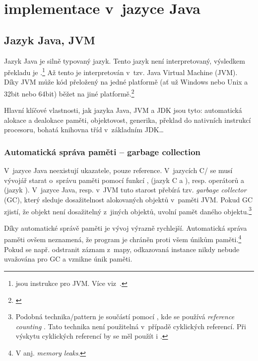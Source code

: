 \chapter{\MIndex{} implementace v~jazyce Java}


\section{Jazyk Java, JVM}

Jazyk Java je silně typovaný jazyk. Tento jazyk není interpretovaný,
výsledkem překladu je \bytecode{}.\footnote{\bytecode{} jsou instrukce pro JVM. Více viz~.} Až tento \bytecode{} je interpretován v~tzv. Java Virtual Machine (JVM).
Díky JVM může kód přeložený na jedné platformě (ať už Windows nebo Unix a 32bit nebo 64bit) běžet na jiné platformě.\footnote{\emph{}\cite{lindholm2013java}}

Hlavní klíčové vlastnosti, jak jazyka Java, JVM a JDK
jsou tyto: automatická alokace a dealokace paměti, objektovost, generika,
překlad \bytecode{} do nativních instrukcí procesoru, bohatá
knihovna tříd v~základním JDK\ldots{}

\subsection{Automatická správa paměti -- garbage collection\label{sec:memorymanagement}}

V~jazyce Java neexistují ukazatele, pouze reference.
V~jazycích C/\CC{} se musí vývojář starat o~správu paměti pomocí funkcí ,  (jazyk C a \CC), resp. operátorů  a  (jazyk \CC).
V~jazyce Java, resp. v~JVM \cite{lindholm2013java} tuto starost přebírá tzv. \emph{garbage collector} (GC), který sleduje dosažitelnost alokovaných objektů v~paměti JVM.
Pokud GC zjistí, že objekt není dosažitelný z~jiných objektů, uvolní pamět daného objektu.\footnote{Podobná technika/pattern je součástí  pomocí , kde se používá \emph{reference counting} \cite{ISO:2012:CPP}.
Tato technika není použitelná v~případě cyklických referencí.
Při výskytu cyklických referencí by se měl použít i .
}

Díky automatické správě paměti je vývoj výrazně rychlejší.
Automatická správa paměti ovšem neznamená, že program je chráněn proti všem únikům paměti.\footnote{V anj. \emph{memory leaks}.}
Pokud se např.  odstranit záznam z~mapy, odkazovaná instance nikdy nebude uvažována pro GC a vznikne únik paměti.

